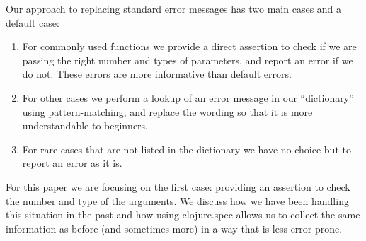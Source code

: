 \documentclass[12pt]{article}
\begin{document}
Our approach to replacing standard error messages has two main cases and a default case:
\begin{enumerate}
\item For commonly used functions we provide a direct assertion to check if we are passing the right number and types 
of parameters, and report an error if we do not. These errors are more informative than default errors.
\item For other cases we perform a lookup of an error message in our ``dictionary'' using pattern-matching, 
and replace the wording so that it is more understandable to beginners. 
\item For rare cases that are not listed in the dictionary we have no choice but to report an error as it is. 
\end{enumerate}
For this paper we are focusing on the first case: providing an assertion to check the number and type of the
arguments. We discuss how we have been handling this situation in the past and how using clojure.spec 
allows us to collect the same information as before (and sometimes more) in a way that is less error-prone. 
\end{document}
